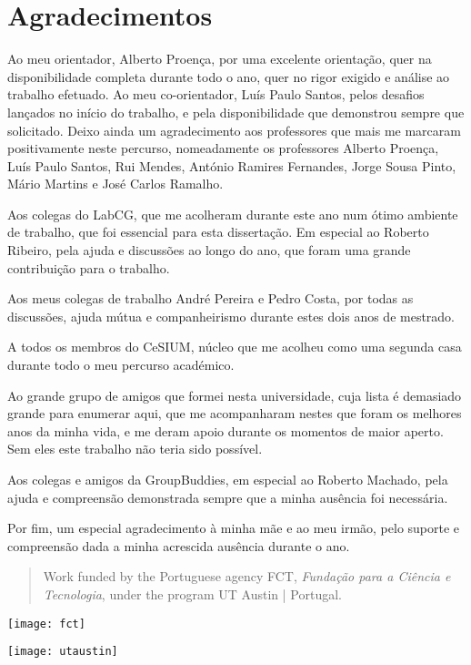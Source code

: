 \documentclass[main.tex]{subfiles}
\begin{document}
\chapter*{Agradecimentos}

Ao meu orientador, Alberto Proença, por uma excelente orientação, quer na disponibilidade completa durante todo o ano, quer no rigor exigido e análise ao trabalho efetuado. Ao meu co-orientador, Luís Paulo Santos, pelos desafios lançados no início do trabalho, e pela disponibilidade que demonstrou sempre que solicitado. Deixo ainda um agradecimento aos professores que mais me marcaram positivamente neste percurso, nomeadamente os professores Alberto Proença, Luís Paulo Santos, Rui Mendes, António Ramires Fernandes, Jorge Sousa Pinto, Mário Martins e José Carlos Ramalho.

Aos colegas do LabCG, que me acolheram durante este ano num ótimo ambiente de trabalho, que foi essencial para esta dissertação. Em especial ao Roberto Ribeiro, pela ajuda e discussões ao longo do ano, que foram uma grande contribuição para o trabalho.

Aos meus colegas de trabalho André Pereira e Pedro Costa, por todas as discussões, ajuda mútua e companheirismo durante estes dois anos de mestrado.

A todos os membros do CeSIUM, núcleo que me acolheu como uma segunda casa durante todo o meu percurso académico.

Ao grande grupo de amigos que formei nesta universidade, cuja lista é demasiado grande para enumerar aqui, que me acompanharam nestes que foram os melhores anos da minha vida, e me deram apoio durante os momentos de maior aperto. Sem eles este trabalho não teria sido possível.

Aos colegas e amigos da GroupBuddies, em especial ao Roberto Machado, pela ajuda e compreensão demonstrada sempre que a minha ausência foi necessária.

Por fim, um especial agradecimento à minha mãe e ao meu irmão, pelo suporte e compreensão dada a minha acrescida ausência durante o ano.

\clearpage

\begin{quote}
  Work funded by the Portuguese agency FCT, \textit{Fundação para a Ciência e Tecnologia}, under the program UT Austin | Portugal.
\end{quote}

\begin{center}
  \texttt{[image: fct]}

  \texttt{[image: utaustin]}
\end{center}
\end{document}
